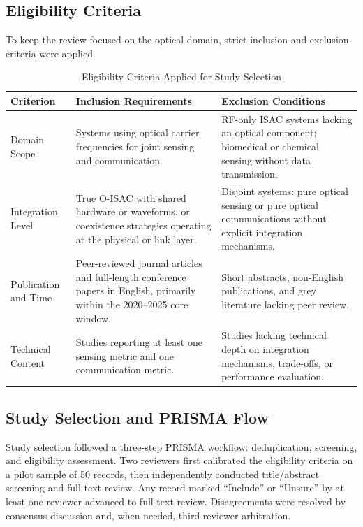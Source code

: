 \subsection{Eligibility Criteria}
To keep the review focused on the optical domain, strict inclusion and exclusion criteria were applied.

\begin{table}[!t]
\caption{Eligibility Criteria Applied for Study Selection}
\label{tab:eligibility-criteria}
\centering
\footnotesize
\setlength{\tabcolsep}{4pt}
\begin{tabularx}{\textwidth}{p{}XX}
\toprule
\textbf{Criterion} & \textbf{Inclusion Requirements} & \textbf{Exclusion Conditions} \\
\midrule
Domain Scope & Systems using optical carrier frequencies for joint sensing and communication. & RF-only ISAC systems lacking an optical component; biomedical or chemical sensing without data transmission. \\
Integration Level & True O-ISAC with shared hardware or waveforms, or coexistence strategies operating at the physical or link layer. & Disjoint systems: pure optical sensing or pure optical communications without explicit integration mechanisms. \\
Publication and Time & Peer-reviewed journal articles and full-length conference papers in English, primarily within the 2020--2025 core window. & Short abstracts, non-English publications, and grey literature lacking peer review. \\
Technical Content & Studies reporting at least one sensing metric and one communication metric. & Studies lacking technical depth on integration mechanisms, trade-offs, or performance evaluation. \\
\bottomrule
\end{tabularx}
\end{table}

\subsection{Study Selection and PRISMA Flow}
Study selection followed a three-step PRISMA workflow: deduplication, screening, and eligibility assessment. Two reviewers first calibrated the eligibility criteria on a pilot sample of 50 records, then independently conducted title/abstract screening and full-text review. Any record marked ``Include'' or ``Unsure'' by at least one reviewer advanced to full-text review. Disagreements were resolved by consensus discussion and, when needed, third-reviewer arbitration.

